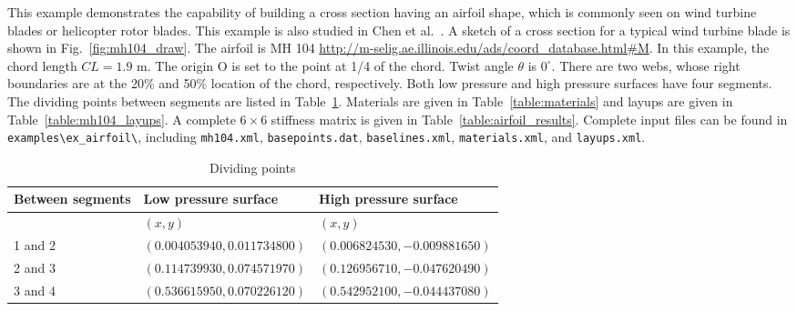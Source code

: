 \documentclass{book}
\begin{document}
This example demonstrates the capability of building a cross section 
having an airfoil shape, which is commonly seen on wind turbine blades 
or helicopter rotor blades. This example is also studied in Chen et al.~\cite{chen2010}. 
A sketch of a cross section for a typical wind turbine blade is shown 
in Fig.~\ref{fig:mh104_draw}. The airfoil is MH 104 
\url{http://m-selig.ae.illinois.edu/ads/coord_database.html#M}. In this 
example, the chord length $CL=1.9$ m. The origin O is set to the point 
at 1/4 of the chord. Twist angle $\theta$ is $0^\circ$. There are two 
webs, whose right boundaries are at the 20\% and 50\% location of the 
chord, respectively. Both low pressure and high pressure surfaces have 
four segments. The dividing points between segments are listed in 
Table~\ref{table:div_pts}. Materials are given in Table~\ref{table:materials} 
and layups are given in Table~\ref{table:mh104_layups}. A complete $6\times 6$ 
stiffness matrix is given in Table~\ref{table:airfoil_results}. 
Complete input files can be found in \lstinline{examples\ex_airfoil\}, 
including \lstinline{mh104.xml}, \lstinline{basepoints.dat}, \lstinline{baselines.xml}, 
\lstinline{materials.xml}, and \lstinline{layups.xml}.

\begin{table}[h]
  \centering
  \caption{Dividing points}
  \begin{tabular}{lll}
    \toprule
    Between segments & Low pressure surface & High pressure surface \\
    \midrule
            & $(x, y)$ & $(x, y)$ \\
    1 and 2 & $(0.004053940, 0.011734800)$ & $(0.006824530, -0.009881650)$ \\
    2 and 3 & $(0.114739930, 0.074571970)$ & $(0.126956710, -0.047620490)$ \\
    3 and 4 & $(0.536615950, 0.070226120)$ & $(0.542952100, -0.044437080)$ \\
    \bottomrule
  \end{tabular}
  \label{table:div_pts}
\end{table}
\end{document}
